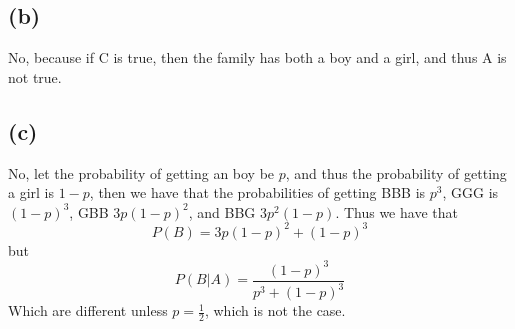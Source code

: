 \subsection*{(b)}
No, because if C is true, then the family has both a boy and a girl, and thus
A is not true. 
\subsection*{(c)}
No, let the probability of getting an boy be $p$, and thus the probability of getting 
a girl is $1-p$, then we have that the probabilities of getting 
BBB is $p^3$, GGG is $(1-p)^3$, GBB $3p(1-p)^2$, and BBG $3p^2(1-p)$. 
Thus we have that 
$$P(B)=3p(1-p)^2+(1-p)^3$$
but
$$P(B|A)=\frac{(1-p)^3}{p^3+(1-p)^3}$$
Which are different unless $p=\frac{1}{2}$, which is not the case.
